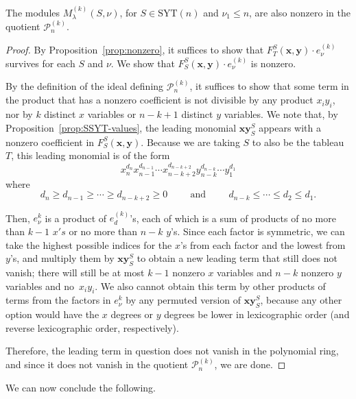 \documentclass[ALCO,Unicode]{cedram}
\newcommand{\SYT}{\mathrm{SYT}}
\begin{document}
\begin{lemma}\label{lem:still-nonzero}
	The modules $M^{(k)}_\lambda(S,\nu)$, for $S\in \SYT(n)$ and $\nu_1\le n$, are also nonzero in the quotient $\mathcal{P}_n^{(k)}$.
\end{lemma}

\begin{proof}
	By Proposition~\ref{prop:nonzero}, it suffices to show that $F_T^S(\mathbf{x},\mathbf{y})\cdot e_\nu^{(k)}$ survives for each $S$ and $\nu$.   We show that $F_S^S(\mathbf{x},\mathbf{y})\cdot e_\nu^{(k)}$ is nonzero.
	
	By the definition of the ideal defining $\mathcal{P}_n^{(k)}$, it suffices to show that some term in the product that has a nonzero coefficient is not divisible by any product $x_iy_i$, nor by $k$ distinct $x$ variables or $n-k+1$ distinct $y$ variables.  We note that, by Proposition~\ref{prop:SSYT-values}, the leading monomial $\mathbf{xy}_S^S$ appears with a nonzero coefficient in $F_S^S(\mathbf{x},\mathbf{y})$.  Because we are taking $S$ to also be the tableau $T$, this leading monomial is of the form $$x_n^{d_n}x_{n-1}^{d_{n-1}}\cdots x_{n-k+2}^{d_{n-k+2}} y_{n-k}^{d_{n-k}}\cdots y_1^{d_1}$$ where $$d_n\ge d_{n-1}\ge \cdots \ge d_{n-k+2}\ge 0\hspace{1cm}\text{and} \hspace{1cm} d_{n-k}\le \cdots \le d_2\le d_1.$$
	
	Then, $e_\nu^{k}$ is a product of $e_d^{(k)}$'s, each of which is a sum of products of no more than $k-1$ $x's$ or no more than $n-k$ $y$'s.  Since each factor is symmetric, we can take the highest possible indices for the $x$'s from each factor and the lowest from $y$'s, and multiply them by $\mathbf{xy}_S^S$ to obtain a new leading term that still does not vanish; there will still be at most $k-1$ nonzero $x$ variables and $n-k$ nonzero $y$ variables and no~$x_iy_i$.  We also cannot obtain this term by other products of terms from the factors in $e_\nu^{k}$ by any permuted version of $\mathbf{xy}_S^S$, because any other option would have the $x$ degrees or $y$ degrees be lower in lexicographic order (and reverse lexicographic order, respectively).  
	
	Therefore, the leading term in question does not vanish in the polynomial ring, and since it does not vanish in the quotient $\mathcal{P}_n^{(k)}$, we are done.
\end{proof}

We can now conclude the following.
\end{document}
